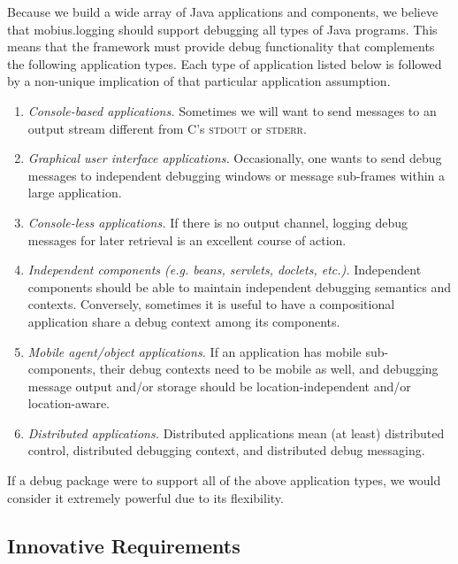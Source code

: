 \documentclass{article}
\begin{document}
Because we build a wide array of Java applications and components, we
believe that mobius.logging should support debugging all types of Java
programs.  This means that the framework must provide debug
functionality that complements the following application types.  Each
type of application listed below is followed by a non-unique
implication of that particular application assumption.
\begin{enumerate}
\item \emph{Console-based applications.} Sometimes we will want to
  send messages to an output stream different from C's \textsc{stdout}
  or \textsc{stderr}.
\item \emph{Graphical user interface applications.} Occasionally, one
  wants to send debug messages to independent debugging windows or
  message sub-frames within a large application.
\item \emph{Console-less applications.} If there is no output channel,
  logging debug messages for later retrieval is an excellent course of
  action. 
\item \emph{Independent components (e.g. beans, servlets, doclets,
    etc.).} Independent components should be able to maintain
  independent debugging semantics and contexts.  Conversely, sometimes
  it is useful to have a compositional application share a debug
  context among its components.
\item \emph{Mobile agent/object applications.} If an application has
  mobile sub-components, their debug contexts need to be mobile as
  well, and debugging message output and/or storage should be
  location-independent and/or location-aware.
\item \emph{Distributed applications.} Distributed applications mean
  (at least) distributed control, distributed debugging context, and
  distributed debug messaging.
\end{enumerate}

If a debug package were to support all of the above application types,
we would consider it extremely powerful due to its flexibility.

\subsection{Innovative Requirements}
\label{sec:innovation}
\end{document}

